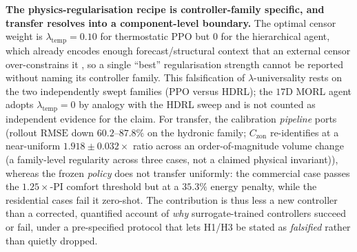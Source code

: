 \documentclass[a4paper,fleqn]{cas-sc}
\newcommand{\RMSE}{\ensuremath{\mathrm{RMSE}}}
\newcommand{\Czon}{\ensuremath{C_{\mathrm{zon}}}}
\begin{document}
\textbf{The physics-regularisation recipe is controller-family specific, and transfer resolves into a component-level boundary.} The optimal censor weight is $\lambda_{\mathrm{temp}}=0.10$ for thermostatic PPO but $0$ for the hierarchical agent, which already encodes enough forecast/structural context that an external censor over-constrains it \citep{Liao2025HDRL,Byeon2025MaxMinMORL}, so a single ``best'' regularisation strength cannot be reported without naming its controller family. This falsification of $\lambda$-universality rests on the two independently swept families (PPO versus HDRL); the $17$D MORL agent adopts $\lambda_{\mathrm{temp}}=0$ by analogy with the HDRL sweep and is not counted as independent evidence for the claim. For transfer, the calibration \emph{pipeline} ports (rollout \RMSE{} down $60.2$--$87.8\%$ on the hydronic family; $\Czon$ re-identifies at a near-uniform $1.918\pm0.032\times$ ratio across an order-of-magnitude volume change (a family-level regularity across three cases, not a claimed physical invariant)), whereas the frozen \emph{policy} does not transfer uniformly: the commercial case passes the $1.25\times$-PI comfort threshold but at a $35.3\%$ energy penalty, while the residential cases fail it zero-shot. The contribution is thus less a new controller than a corrected, quantified account of \emph{why} surrogate-trained controllers succeed or fail, under a pre-specified protocol that lets H1/H3 be stated as \emph{falsified} rather than quietly dropped.
\end{document}
